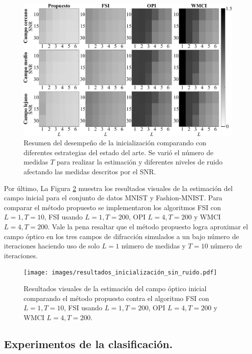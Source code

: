 \begin{figure}[h!]
         \includegraphics[width=1\linewidth]{images/Noisy_Initializations.pdf}
        \caption{Resumen del desempeño de la inicialización comparando con diferentes estrategias del estado del arte. Se varió el número de medidas $T$ para realizar la estimación y diferentes niveles de ruido afectando las medidas descritos por el SNR.}
        \label{fig:noisy_scenario}
\end{figure}

Por último, La Figura \ref{fig:resultados_inicialización_sin_ruido} muestra los resultados visuales de la estimación del campo inicial para el conjunto de datos MNIST y Fashion-MNIST. Para comparar el método propuesto se implementaron los algoritmos FSI con $L = 1, T = 10$, FSI usando $L = 1, T=200$, OPI $L = 4, T=200$ y WMCI $L = 4, T=200$. Vale la pena resaltar que el método propuesto logra aproximar el campo óptico en los tres campos de difracción simulados a un bajo número de iteraciones haciendo uso de solo $L=1$ número de medidas y $T=10$ número de iteraciones.

\begin{figure}[!h]
    \centering
    \texttt{[image: images/resultados\_inicialización\_sin\_ruido.pdf]}
    \caption{Resultados visuales de la estimación del campo óptico inicial comparando el método propuesto contra el algoritmo FSI con $L = 1, T = 10$, FSI usando $L = 1, T=200$, OPI $L = 4, T=200$ y WMCI $L = 4, T=200$.}
    \label{fig:resultados_inicialización_sin_ruido}
\end{figure}

\subsection{Experimentos de la clasificación.}

